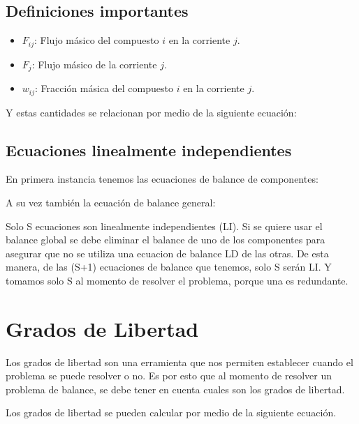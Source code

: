 \subsection{Definiciones importantes}

\begin{itemize}
    \item $F_{ij}$: Flujo másico del compuesto $i$ en la corriente $j$.
    \item $F_j$: Flujo másico de la corriente $j$.
    \item $w_{ij}$: Fracción másica del compuesto $i$ en la corriente $j$.
\end{itemize}

Y estas cantidades se relacionan por medio de la siguiente ecuación:


\subsection{Ecuaciones linealmente independientes}

En primera instancia tenemos las ecuaciones de balance de componentes:


A su vez también la ecuación de balance general:


Solo S ecuaciones son linealmente independientes (LI). Si se quiere usar el balance global se debe eliminar el balance de uno de los componentes para
asegurar que no se utiliza una ecuacion de balance LD de las otras. De esta manera, de las (S+1) ecuaciones de balance que tenemos, solo S serán LI. Y tomamos solo S al momento de resolver el problema, 
porque una es redundante.

\section{Grados de Libertad}

Los grados de libertad son una erramienta que nos permiten establecer cuando el problema se puede resolver o no.
Es por esto que al momento de resolver un problema de balance, se debe tener en cuenta cuales son los grados de libertad.

Los grados de libertad se pueden calcular por medio de la siguiente ecuación.

